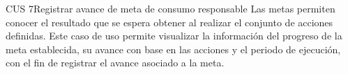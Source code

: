 
\begin{UseCase}{CUS 7}{Registrar avance de meta de consumo responsable}
{
    Las metas permiten conocer el resultado que se espera obtener al realizar el conjunto de acciones definidas. Este caso de uso permite visualizar la información del progreso de la meta establecida, su avance con base en las acciones y el periodo de ejecución, con el fin de registrar el avance asociado a la meta.
}
    

    


\end{UseCase}
